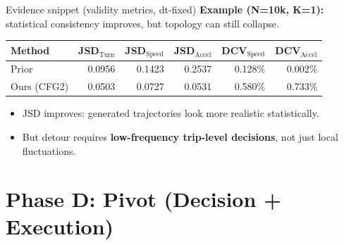 \documentclass[aspectratio=169]{beamer}
\begin{document}
\begin{frame}{Evidence snippet (validity metrics, dt-fixed)}
\scriptsize\textbf{Example (N=10k, K=1):} statistical consistency improves, but topology can still collapse.
\vspace{0.4em}
\begin{table}
  \centering
  \begin{tabular}{lrrrrr}
    \toprule
    Method & JSD$_{\text{Turn}}$ & JSD$_{\text{Speed}}$ & JSD$_{\text{Accel}}$ & DCV$_{\text{Speed}}$ & DCV$_{\text{Accel}}$ \\
    \midrule
    Prior & 0.0956 & 0.1423 & 0.2537 & 0.128\% & 0.002\% \\
    Ours (CFG2) & 0.0503 & 0.0727 & 0.0531 & 0.580\% & 0.733\% \\
    \bottomrule
  \end{tabular}
\end{table}
\vspace{-0.2em}
\begin{itemize}
  \item JSD improves: generated trajectories look more realistic statistically.
  \item But detour requires \textbf{low-frequency trip-level decisions}, not just local fluctuations.
\end{itemize}
\end{frame}

\section{Phase D: Pivot (Decision + Execution)}
\end{document}
